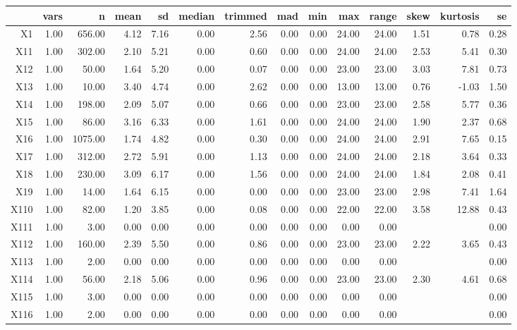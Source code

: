 % 
\begin{tabular}{rrrrrrrrrrrrrr}
  \hline
 & vars & n & mean & sd & median & trimmed & mad & min & max & range & skew & kurtosis & se \\ 
  \hline
X1 & 1.00 & 656.00 & 4.12 & 7.16 & 0.00 & 2.56 & 0.00 & 0.00 & 24.00 & 24.00 & 1.51 & 0.78 & 0.28 \\ 
  X11 & 1.00 & 302.00 & 2.10 & 5.21 & 0.00 & 0.60 & 0.00 & 0.00 & 24.00 & 24.00 & 2.53 & 5.41 & 0.30 \\ 
  X12 & 1.00 & 50.00 & 1.64 & 5.20 & 0.00 & 0.07 & 0.00 & 0.00 & 23.00 & 23.00 & 3.03 & 7.81 & 0.73 \\ 
  X13 & 1.00 & 10.00 & 3.40 & 4.74 & 0.00 & 2.62 & 0.00 & 0.00 & 13.00 & 13.00 & 0.76 & -1.03 & 1.50 \\ 
  X14 & 1.00 & 198.00 & 2.09 & 5.07 & 0.00 & 0.66 & 0.00 & 0.00 & 23.00 & 23.00 & 2.58 & 5.77 & 0.36 \\ 
  X15 & 1.00 & 86.00 & 3.16 & 6.33 & 0.00 & 1.61 & 0.00 & 0.00 & 24.00 & 24.00 & 1.90 & 2.37 & 0.68 \\ 
  X16 & 1.00 & 1075.00 & 1.74 & 4.82 & 0.00 & 0.30 & 0.00 & 0.00 & 24.00 & 24.00 & 2.91 & 7.65 & 0.15 \\ 
  X17 & 1.00 & 312.00 & 2.72 & 5.91 & 0.00 & 1.13 & 0.00 & 0.00 & 24.00 & 24.00 & 2.18 & 3.64 & 0.33 \\ 
  X18 & 1.00 & 230.00 & 3.09 & 6.17 & 0.00 & 1.56 & 0.00 & 0.00 & 24.00 & 24.00 & 1.84 & 2.08 & 0.41 \\ 
  X19 & 1.00 & 14.00 & 1.64 & 6.15 & 0.00 & 0.00 & 0.00 & 0.00 & 23.00 & 23.00 & 2.98 & 7.41 & 1.64 \\ 
  X110 & 1.00 & 82.00 & 1.20 & 3.85 & 0.00 & 0.08 & 0.00 & 0.00 & 22.00 & 22.00 & 3.58 & 12.88 & 0.43 \\ 
  X111 & 1.00 & 3.00 & 0.00 & 0.00 & 0.00 & 0.00 & 0.00 & 0.00 & 0.00 & 0.00 &  &  & 0.00 \\ 
  X112 & 1.00 & 160.00 & 2.39 & 5.50 & 0.00 & 0.86 & 0.00 & 0.00 & 23.00 & 23.00 & 2.22 & 3.65 & 0.43 \\ 
  X113 & 1.00 & 2.00 & 0.00 & 0.00 & 0.00 & 0.00 & 0.00 & 0.00 & 0.00 & 0.00 &  &  & 0.00 \\ 
  X114 & 1.00 & 56.00 & 2.18 & 5.06 & 0.00 & 0.96 & 0.00 & 0.00 & 23.00 & 23.00 & 2.30 & 4.61 & 0.68 \\ 
  X115 & 1.00 & 3.00 & 0.00 & 0.00 & 0.00 & 0.00 & 0.00 & 0.00 & 0.00 & 0.00 &  &  & 0.00 \\ 
  X116 & 1.00 & 2.00 & 0.00 & 0.00 & 0.00 & 0.00 & 0.00 & 0.00 & 0.00 & 0.00 &  &  & 0.00 \\ 
   \hline
\end{tabular}

